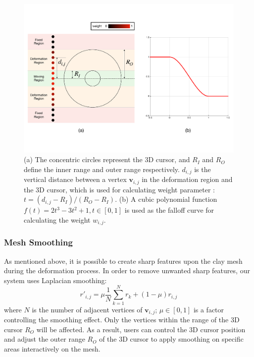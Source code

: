 \documentclass{svjour3}                     %
\begin{document}
\begin{figure}
\includegraphics[width=\textwidth]{fig8.pdf}
\caption{(a) The concentric circles represent the 3D cursor, and $R_{I}$ and $R_{O}$ define the inner range and outer range respectively. $d_{i,j}$ is the vertical distance between a vertex $\mathbf{v}_{i,j}$ in the deformation region and the 3D cursor, which is used for calculating weight parameter : $t = (d_{i,j} - R_{I}) / (R_{O} - R_{I})$. (b) A cubic polynomial function $f(t) = 2t^3 - 3t^2 + 1, t \in [0,1]$ is used as the falloff curve for calculating the weight $w_{i,j}$. }
\label{fig:deform}
\end{figure}

\subsubsection{Mesh Smoothing}
\label{sec:4.2.4}
As mentioned above, it is possible to create sharp features upon the clay mesh during the deformation process. In order to remove unwanted sharp features, our system uses Laplacian smoothing:
\begin{equation}
r'_{i,j} = 
\mu  \frac{1}{N} 
\sum_{k=1}^N r_{k}
+ (1 - \mu)  r_{i,j}
\end{equation}
where $N$ is the number of adjacent vertices of $\mathbf{v}_{i,j}$; $\mu \in [0,1]$ is a factor controlling the smoothing effect.
Only the vertices within the range of the 3D cursor $R_{O}$ will be affected.
As a result, users can control the 3D cursor position and adjust the outer range $R_{O}$ of the 3D cursor to apply smoothing on specific areas interactively on the mesh.


\end{document}
